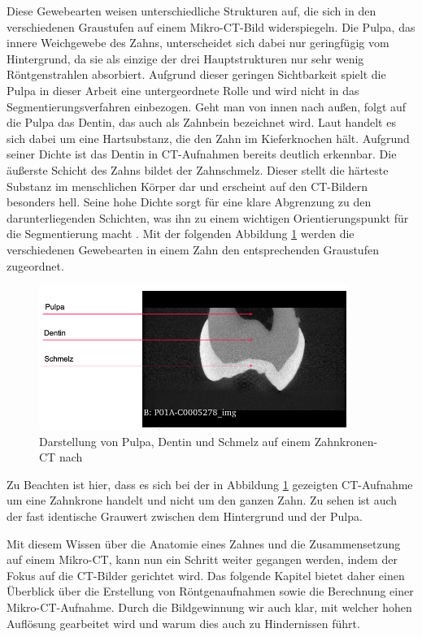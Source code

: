 Diese Gewebearten weisen unterschiedliche Strukturen auf, die sich in den
verschiedenen Graustufen auf einem Mikro-\ac{CT}-Bild widerspiegeln. Die Pulpa, das
innere Weichgewebe des Zahns, unterscheidet sich dabei nur geringfügig vom
Hintergrund, da sie als einzige der drei Hauptstrukturen nur sehr wenig Röntgenstrahlen
absorbiert. Aufgrund dieser geringen Sichtbarkeit spielt die Pulpa in dieser
Arbeit eine untergeordnete Rolle und wird nicht in das Segmentierungsverfahren
einbezogen. Geht man von innen nach außen, folgt auf die Pulpa das Dentin, das auch
als Zahnbein bezeichnet wird. Laut \citet[S.~41]{lehmann2012Zahnheilkunde} handelt
es sich dabei um eine Hartsubstanz, die den Zahn im Kieferknochen hält. Aufgrund
seiner Dichte ist das Dentin in \ac{CT}-Aufnahmen bereits deutlich erkennbar. Die
äußerste Schicht des Zahns bildet der Zahnschmelz. Dieser stellt die härteste
Substanz im menschlichen Körper dar und erscheint auf den \ac{CT}-Bildern besonders
hell. Seine hohe Dichte sorgt für eine klare Abgrenzung zu den darunterliegenden
Schichten, was ihn zu einem wichtigen Orientierungspunkt für die Segmentierung macht
\citep[vgl.][S.~41]{lehmann2012Zahnheilkunde}. Mit der folgenden Abbildung \ref{fig:pulpa_dentin_schmelz}
werden die verschiedenen Gewebearten in einem Zahn den entsprechenden Graustufen
zugeordnet.

\begin{figure}[h]
	\centering
	\includegraphics[width=0.9\textwidth]{img/dentin_schmelz_pulpa.png}
	\caption{Darstellung von Pulpa, Dentin und Schmelz auf einem Zahnkronen-CT nach
	\citet{heck2024}}
	\label{fig:pulpa_dentin_schmelz}
\end{figure}

Zu Beachten ist hier, dass es sich bei der in Abbildung \ref{fig:pulpa_dentin_schmelz}
gezeigten \ac{CT}-Aufnahme um eine Zahnkrone handelt und nicht um den ganzen
Zahn. Zu sehen ist auch der fast identische Grauwert zwischen dem Hintergrund und
der Pulpa.

Mit diesem Wissen über die Anatomie eines Zahnes und die Zusammensetzung auf einem
Mikro-\ac{CT}, kann nun ein Schritt weiter gegangen werden, indem der Fokus auf
die \ac{CT}-Bilder gerichtet wird. Das folgende Kapitel bietet daher einen
Überblick über die Erstellung von Röntgenaufnahmen sowie die Berechnung einer
Mikro-\ac{CT}-Aufnahme. Durch die Bildgewinnung wir auch klar, mit welcher hohen
Auflösung gearbeitet wird und warum dies auch zu Hindernissen führt.

